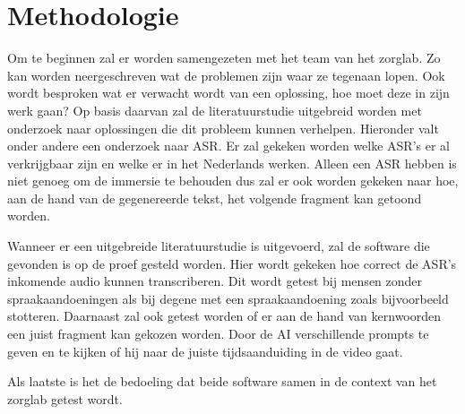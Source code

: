 

\section{Methodologie}%
\label{sec:methodologie}

Om te beginnen zal er worden samengezeten met het team van het zorglab. Zo kan worden neergeschreven wat de problemen zijn waar ze tegenaan lopen. Ook wordt besproken wat er verwacht wordt van een oplossing, hoe moet deze in zijn werk gaan? Op basis daarvan zal de literatuurstudie uitgebreid worden met onderzoek naar oplossingen die dit probleem kunnen verhelpen. Hieronder valt onder andere een onderzoek naar ASR. Er zal gekeken worden welke ASR's er al verkrijgbaar zijn en welke er in het Nederlands werken. Alleen een ASR hebben is niet genoeg om de immersie te behouden dus zal er ook worden gekeken naar hoe, aan de hand van de gegenereerde tekst, het volgende fragment kan getoond worden.

Wanneer er een uitgebreide literatuurstudie is uitgevoerd, zal de software die gevonden is op de proef gesteld worden. Hier wordt gekeken hoe correct de ASR's inkomende audio kunnen transcriberen. Dit wordt getest bij mensen zonder spraakaandoeningen als bij degene met een spraakaandoening zoals bijvoorbeeld stotteren. Daarnaast zal ook getest worden of er aan de hand van kernwoorden een juist fragment kan gekozen worden. Door de AI verschillende prompts te geven en te kijken of hij naar de juiste tijdsaanduiding in de video gaat.

Als laatste is het de bedoeling dat beide software samen in de context van het zorglab getest wordt.

